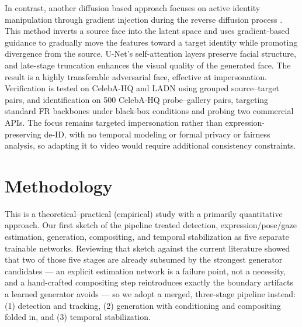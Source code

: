 \documentclass[12pt]{article}
\begin{document}
In contrast, another diffusion based approach focuses on active identity manipulation through gradient injection during the reverse diffusion process \cite{wang}. This method inverts a source face into the latent space and uses gradient-based guidance to gradually move the features toward a target identity while promoting divergence from the source. U-Net’s self-attention layers preserve facial structure, and late-stage truncation enhances the visual quality of the generated face. The result is a highly transferable adversarial face, effective at impersonation. Verification is tested on CelebA-HQ \cite{celebahq} and LADN \cite{ladn} using grouped source–target pairs, and identification on 500 CelebA-HQ probe–gallery pairs, targeting standard FR backbones under black-box conditions and probing two commercial APIs. The focus remains targeted impersonation rather than expression-preserving de-ID, with no temporal modeling or formal privacy or fairness analysis, so adapting it to video would require additional consistency constraints.

\section{Methodology}

This is a theoretical–practical (empirical) study with a primarily quantitative approach. Our first sketch of the pipeline treated detection, expression/pose/gaze estimation, generation, compositing, and temporal stabilization as five separate trainable networks. Reviewing that sketch against the current literature showed that two of those five stages are already subsumed by the strongest generator candidates — an explicit estimation network is a failure point, not a necessity, and a hand-crafted compositing step reintroduces exactly the boundary artifacts a learned generator avoids — so we adopt a merged, three-stage pipeline instead: (1) detection and tracking, (2) generation with conditioning and compositing folded in, and (3) temporal stabilization.
\end{document}
